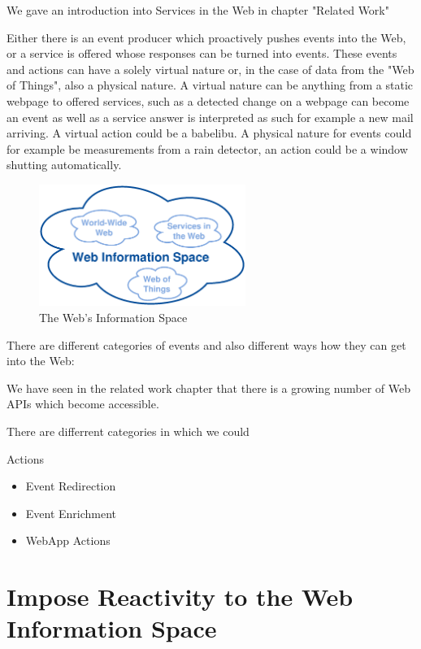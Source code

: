 We gave an introduction into \textrm{Services in the Web} in chapter "Related Work"


Either there is an event producer which proactively pushes events into the Web, or a service is offered whose responses can be turned into events.
These events and actions can have a solely virtual nature or, in the case of data from the \textrm{"Web of Things"}, also a physical nature.
A virtual nature can be anything from a static webpage to offered services, such as a detected change on a webpage can become an event as well as a service answer is interpreted as such for example a new mail arriving.
A virtual action could be a babelibu.
A physical nature for events could for example be measurements from a rain detector, an action could be a window shutting automatically.

\begin{figure}[!ht]
  \centering
  \includegraphics[width=0.6\textwidth]{figures/InformationSpace}
  \caption{The Web's Information Space}
  \label{fig:InformationSpace}
\end{figure}
There are different categories of events and also different ways how they can get into the Web:

We have seen in the related work chapter that there is a growing number of Web APIs which become accessible.


There are differrent categories in which we could 

Actions
\begin{itemize}
  \item Event Redirection
  \item Event Enrichment
  \item WebApp Actions
\end{itemize}


\section{Impose Reactivity to the Web Information Space}

